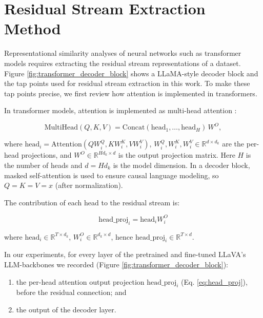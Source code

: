 \section{Residual Stream Extraction Method}\label{sec:residual_stream_extraction_method}

Representational similarity analyses of neural networks such as transformer models requires extracting the residual stream representations of a dataset. Figure \ref{fig:transformer_decoder_block} shows a LLaMA-style decoder block and the tap points used for residual stream extraction in this work. To make these tap points precise, we first review how attention is implemented in transformers.

In transformer models, attention is implemented as multi-head attention \cite{vaswaniAttentionAllYou2023}:

\begin{equation}
\mathrm{MultiHead}(Q,K,V)=\mathrm{Concat}(\text{head}_1,\ldots,\text{head}_H)\,W^O,
\end{equation}

where $\text{head}_i=\mathrm{Attention}(QW^Q_i,KW^K_i,VW^V_i)$, $W^Q_i,W^K_i,W^V_i\in\mathbb{R}^{d\times d_k}$ are the per-head projections, and $W^O\in\mathbb{R}^{H d_k\times d}$ is the output projection matrix. Here $H$ is the number of heads and $d = H d_k$ is the model dimension. In a decoder block, masked self-attention is used to ensure causal language modeling, so $Q = K = V = x$ (after normalization).

The contribution of each head to the residual stream is:

\begin{equation}
\text{head\_proj}_i = \text{head}_i W^O_i
\label{eq:head_proj}
\end{equation}

where $\text{head}_i \in \mathbb{R}^{T\times d_k}$, $W^O_i\in\mathbb{R}^{d_k\times d}$, hence $\text{head\_proj}_i\in\mathbb{R}^{T\times d}$.


In our experiments, for every layer of the pretrained and fine-tuned LLaVA's LLM-backbones we recorded (Figure \ref{fig:transformer_decoder_block}):
\begin{enumerate}
    \item the per-head attention output projection $\text{head\_proj}_i$ (Eq. \ref{eq:head_proj}), before the residual connection; and
    \item the output of the decoder layer.
\end{enumerate}

